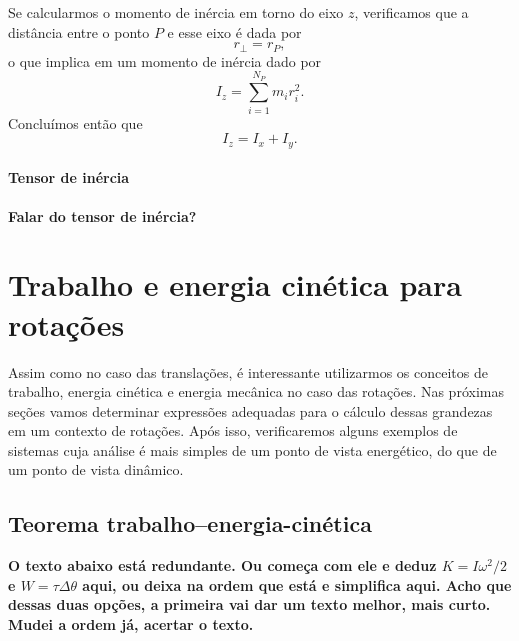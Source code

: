 Se calcularmos o momento de inércia em torno do eixo $z$, verificamos que a distância entre o ponto $P$ e esse eixo é dada por
\begin{equation}
    r_\perp = r_P,
\end{equation}
%
o que implica em um momento de inércia dado por
\begin{equation}
    I_z = \sum_{i = 1}^{N_P} m_i r_i^2.
\end{equation}
%
Concluímos então que
\begin{equation}
    I_z = I_x + I_y.
\end{equation}

\paragraph{Tensor de inércia}

\textbf{Falar do tensor de inércia?}

\section{Trabalho e energia cinética para rotações}

Assim como no caso das translações, é interessante utilizarmos os conceitos de trabalho, energia cinética e energia mecânica no caso das rotações. Nas próximas seções vamos determinar expressões adequadas para o cálculo dessas grandezas em um contexto de rotações. Após isso, verificaremos alguns exemplos de sistemas cuja análise é mais simples de um ponto de vista energético, do que de um ponto de vista dinâmico.

\subsection{Teorema trabalho--energia-cinética}

\textbf{O texto abaixo está redundante. Ou começa com ele e deduz $K = I\omega^2/2$ e $W = \tau\Delta\theta$ aqui, ou deixa na ordem que está e simplifica aqui. Acho que dessas duas opções, a primeira vai dar um texto melhor, mais curto. Mudei a ordem já, acertar o texto.}

